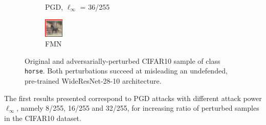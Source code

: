 \begin{figure}[H]
\begin{subfigure}[b]{0.25\textwidth}
        \caption{PGD, $\ell_\infty$ = 36/255}
    \end{subfigure}
    \hfill
    \begin{subfigure}[b]{0.25\textwidth}
        \centering
        \includegraphics[width=\textwidth]{img/results_discussion/adversarial/adv_fmn_framed.png}
        \caption{FMN}
    \end{subfigure}
    \caption{Original and adversarially-perturbed CIFAR10 sample of class \texttt{horse}. Both perturbations succeed
    at misleading an undefended, pre-trained WideResNet-28-10 architecture.}
\end{figure}

The first results presented correspond to PGD attacks with different attack power 
$\ell_\infty$, namely 8/255, 16/255 and 32/255, for increasing ratio of 
perturbed samples in the CIFAR10 dataset.

